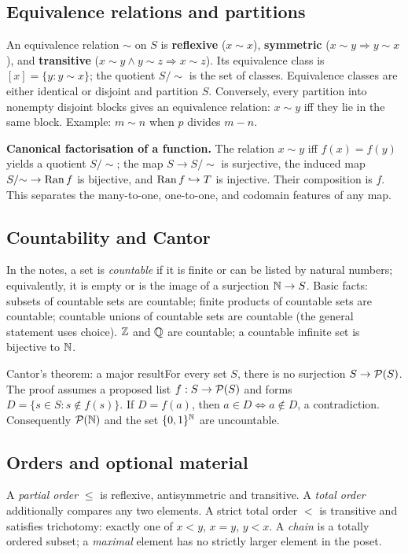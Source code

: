\documentclass[11pt,a4paper]{article}
\begin{document}
\subsection{Equivalence relations and partitions}
An equivalence relation $\sim$ on $S$ is \textbf{reflexive} ($x\sim x$), \textbf{symmetric} ($x\sim y\Rightarrow y\sim x$), and \textbf{transitive} ($x\sim y\land y\sim z\Rightarrow x\sim z$). Its equivalence class is $[x]=\{y:y\sim x\}$; the quotient $S/{\sim}$ is the set of classes. Equivalence classes are either identical or disjoint and partition $S$. Conversely, every partition into nonempty disjoint blocks gives an equivalence relation: $x\sim y$ iff they lie in the same block. Example: $m\sim n$ when $p$ divides $m-n$.

\textbf{Canonical factorisation of a function.} The relation $x\sim y$ iff $f(x)=f(y)$ yields a quotient $S/{\sim}$; the map $S\to S/{\sim}$ is surjective, the induced map $S/{\sim}\to\operatorname{Ran} f$ is bijective, and $\operatorname{Ran} f\hookrightarrow T$ is injective. Their composition is $f$. This separates the many-to-one, one-to-one, and codomain features of any map.
\subsection{Countability and Cantor}
In the notes, a set is \emph{countable} if it is finite or can be listed by natural numbers; equivalently, it is empty or is the image of a surjection $\mathbb N\to S$. Basic facts: subsets of countable sets are countable; finite products of countable sets are countable; countable unions of countable sets are countable (the general statement uses choice). $\mathbb Z$ and $\mathbb Q$ are countable; a countable infinite set is bijective to $\mathbb N$.
\begin{keybox}{Cantor's theorem: a major result}For every set $S$, there is no surjection $S\to\mathcal P(S)$. The proof assumes a proposed list $f:S\to\mathcal P(S)$ and forms $D=\{s\in S:s\notin f(s)\}$. If $D=f(a)$, then $a\in D\iff a\notin D$, a contradiction. Consequently $\mathcal P(\mathbb N)$ and the set $\{0,1\}^{\mathbb N}$ are uncountable.\end{keybox}
\subsection{Orders and optional material}
A \emph{partial order} $\le$ is reflexive, antisymmetric and transitive. A \emph{total order} additionally compares any two elements. A strict total order $<$ is transitive and satisfies trichotomy: exactly one of $x<y$, $x=y$, $y<x$. A \emph{chain} is a totally ordered subset; a \emph{maximal} element has no strictly larger element in the poset.
\end{document}
